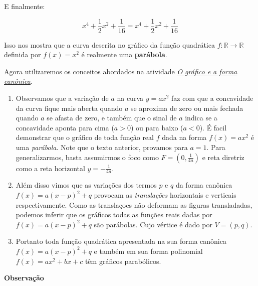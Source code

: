 E finalmente:

$$x^4+\frac{1}{2}x^2+\frac{1}{16}=x^4+\frac{1}{2}x^2+\frac{1}{16}$$

Isso nos mostra que a curva descrita no gráfico da função quadrática \(f:\mathbb{R}\to\mathbb{R}\) definida por \(f(x)=x^2\) é realmente uma \textbf{parábola}.

Agora utilizaremos os conceitos abordados na atividade \hyperref[\detokenize{AF209-5:ativ-funcao-quadratica-graf-curva}]{\textit{O gráfico e a forma canônica}}.
\begin{enumerate}
\item {} 
Observamos que a variação de \(a\) na curva \(y=ax^2\) faz com que a concavidade da curva fique mais aberta quando \(a\) se aproxima de zero ou mais fechada quando \(a\) se afasta de zero, e também que o sinal de \(a\) indica se a concavidade aponta para cima (\(a>0\)) ou para baixo (\(a<0\)). É facil demonstrar que o gráfico de toda função real \(f\) dada na forma \(f(x)=ax^2\) é uma \textit{parábola}. Note que o texto anterior, provamos para \(a=1\). Para generalizarmos, basta assumirmos o foco como \(F=(0,\frac{1}{4a})\) e reta diretriz como a reta horizontal \(y=-\frac{1}{4a}\).

\item {} 
Além disso vimos que as variações dos termos \(p\) e \(q\) da forma canônica \(f(x)=a(x-p)^2+q\) provocam as \textit{translações} horizontais e verticais respectivamente. Como as translaçoes não deformam as figuras transladadas, podemos inferir que os gráficos todas as funções reais dadas por \(f(x)=a(x-p)^2+q\) são parábolas. Cujo vértice é dado por \(V=(p,q)\).

\item {} 
Portanto toda função quadrática apresentada na sua forma canônica \(f(x)=a(x-p)^2+q\) e também em sua forma polinomial \(f(x)=ax^2+bx+c\) têm gráficos parabólicos.

\end{enumerate}

\textbf{Observação}

